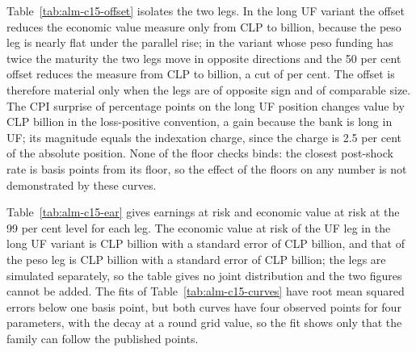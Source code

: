 Table~\ref{tab:alm-c15-offset} isolates the two legs. In the long UF variant the offset reduces the economic value measure only from CLP \almDOffsetOffLong{} to \almDOffsetOnLong{} billion, because the peso leg is nearly flat under the parallel rise; in the variant whose peso funding has twice the maturity the two legs move in opposite directions and the 50 per cent offset reduces the measure from CLP \almDOffsetOffOffset{} to \almDOffsetOnOffset{} billion, a cut of \almDOffsetCut{} per cent. The offset is therefore material only when the legs are of opposite sign and of comparable size. The CPI surprise of \almDCpiPp{} percentage points on the long UF position changes value by CLP \almDCpiEffect{} billion in the loss-positive convention, a gain because the bank is long in UF; its magnitude equals the indexation charge, since the charge is 2.5 per cent of the absolute position. None of the \almDFloorChecks{} floor checks binds: the closest post-shock rate is \almDFloorClosest{} basis points from its floor, so the effect of the floors on any number is not demonstrated by these curves.

Table~\ref{tab:alm-c15-ear} gives earnings at risk and economic value at risk at the 99 per cent level for each leg. The economic value at risk of the UF leg in the long UF variant is CLP \almDEvarUr{} billion with a standard error of CLP \almDEvarSeUr{} billion, and that of the peso leg is CLP \almDEvarClp{} billion with a standard error of CLP \almDEvarSeClp{} billion; the legs are simulated separately, so the table gives no joint distribution and the two figures cannot be added. The fits of Table~\ref{tab:alm-c15-curves} have root mean squared errors below one basis point, but both curves have four observed points for four parameters, with the decay at a round grid value, so the fit shows only that the family can follow the published points.


